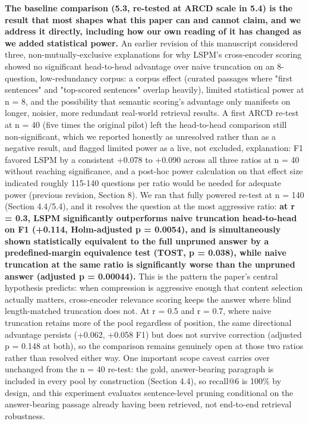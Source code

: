 \textbf{The baseline comparison (5.3, re-tested at ARCD scale in 5.4) is the result that most shapes what this paper can and cannot claim, and we address it directly, including how our own reading of it has changed as we added statistical power.} An earlier revision of this manuscript considered three, non-mutually-exclusive explanations for why LSPM's cross-encoder scoring showed no significant head-to-head advantage over naive truncation on an 8-question, low-redundancy corpus: a corpus effect (curated passages where "first sentences" and "top-scored sentences" overlap heavily), limited statistical power at n = 8, and the possibility that semantic scoring's advantage only manifests on longer, noisier, more redundant real-world retrieval results. A first ARCD re-test at n = 40 (five times the original pilot) left the head-to-head comparison still non-significant, which we reported honestly as unresolved rather than as a negative result, and flagged limited power as a live, not excluded, explanation: F1 favored LSPM by a consistent +0.078 to +0.090 across all three ratios at n = 40 without reaching significance, and a post-hoc power calculation on that effect size indicated roughly 115-140 questions per ratio would be needed for adequate power (previous revision, Section 8). We ran that fully powered re-test at n = 140 (Section 4.4/5.4), and it resolves the question at the most aggressive ratio: \textbf{at r = 0.3, LSPM significantly outperforms naive truncation head-to-head on F1 (+0.114, Holm-adjusted p = 0.0054), and is simultaneously shown statistically equivalent to the full unpruned answer by a predefined-margin equivalence test (TOST, p = 0.038), while naive truncation at the same ratio is significantly worse than the unpruned answer (adjusted p = 0.00044).} This is the pattern the paper's central hypothesis predicts: when compression is aggressive enough that content selection actually matters, cross-encoder relevance scoring keeps the answer where blind length-matched truncation does not. At r = 0.5 and r = 0.7, where naive truncation retains more of the pool regardless of position, the same directional advantage persists (+0.062, +0.058 F1) but does not survive correction (adjusted p = 0.148 at both), so the comparison remains genuinely open at those two ratios rather than resolved either way. One important scope caveat carries over unchanged from the n = 40 re-test: the gold, answer-bearing paragraph is included in every pool by construction (Section 4.4), so recall@6 is 100\% by design, and this experiment evaluates sentence-level pruning conditional on the answer-bearing passage already having been retrieved, not end-to-end retrieval robustness.

